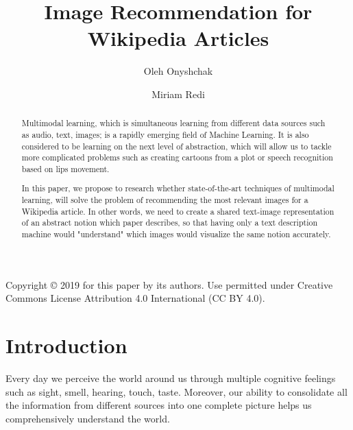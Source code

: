 \documentclass[runningheads]{llncs}
\begin{document}
%
%
\setlength{\tabcolsep}{10pt}
\renewcommand{\arraystretch}{1.5}
%
%
%
\title{Image Recommendation for Wikipedia Articles}
%
\author{Oleh Onyshchak \and Miriam Redi}
%
%
\maketitle              %
%

\begin{abstract}
Multimodal learning, which is simultaneous learning from different data sources such as audio, text, images; is a rapidly emerging field of Machine Learning. It is also considered to be learning on the next level of abstraction, which will allow us to tackle more complicated problems such as creating cartoons from a plot or speech recognition based on lips movement. 

In this paper, we propose to research whether state-of-the-art techniques of multimodal learning, will solve the problem of recommending the most relevant images for a Wikipedia article. In other words, we need to create a shared text-image representation of an abstract notion which paper describes, so that having only a text description machine would "understand" which images would visualize the same notion accurately. 

\end{abstract}

\vfill
{
Copyright © 2019 for this paper by its authors. Use permitted under Creative Commons License Attribution 4.0 International (CC BY 4.0).\\
}
\newpage

\section{Introduction}
Every day we perceive the world around us through multiple cognitive feelings such as sight, smell, hearing, touch, taste. Moreover, our ability to consolidate all the information from different sources into one complete picture helps us comprehensively understand the world.
\end{document}
